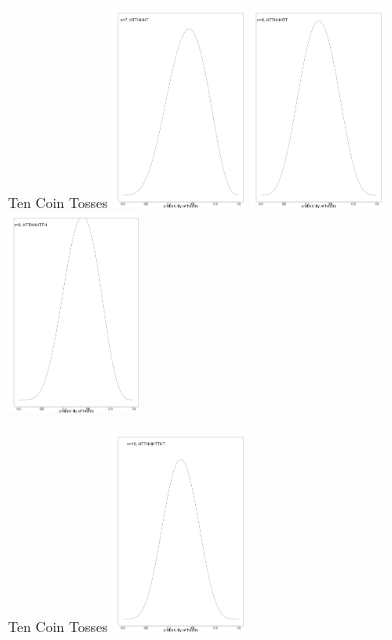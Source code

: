 \documentclass[dvipsnames,mathserif, handout]{beamer}
\begin{document}
{\begin{frame}{Ten Coin Tosses}
    	\includegraphics[width=100pt]{cointosses/Seven.pdf}\pause
    	\includegraphics[width=100pt]{cointosses/Eight.pdf}	\pause
    	\includegraphics[width=100pt]{cointosses/Nine.pdf}
\end{frame}

\begin{frame}{Ten Coin Tosses}
	 \includegraphics[width=100pt]{cointosses/Ten.pdf}
\end{frame}


}
\end{document}
